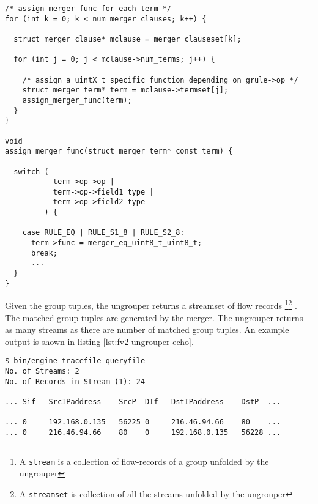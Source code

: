 \begin{lstlisting}
/* assign merger func for each term */
for (int k = 0; k < num_merger_clauses; k++) {

  struct merger_clause* mclause = merger_clauseset[k];

  for (int j = 0; j < mclause->num_terms; j++) {

    /* assign a uintX_t specific function depending on grule->op */
    struct merger_term* term = mclause->termset[j];
    assign_merger_func(term);
  }
}

void
assign_merger_func(struct merger_term* const term) {

  switch (
           term->op->op |
           term->op->field1_type |
           term->op->field2_type
         ) {

    case RULE_EQ | RULE_S1_8 | RULE_S2_8:
      term->func = merger_eq_uint8_t_uint8_t;
      break;
      ...
  }
}
\end{lstlisting}

Given the group tuples, the ungrouper returns a streamset of flow records
\footnote{A \texttt{stream} is a collection of flow-records of a group
unfolded by the ungrouper}\footnote{A \texttt{streamset} is collection of all
the streams unfolded by the ungrouper} . 
The matched group tuples are generated by the merger. The ungrouper returns as
many streams as there are number of matched group tuples.  An example output
is shown in listing \ref{lst:fv2-ungrouper-echo}.

\begin{lstlisting}
$ bin/engine tracefile queryfile
No. of Streams: 2
No. of Records in Stream (1): 24

... Sif   SrcIPaddress    SrcP  DIf   DstIPaddress    DstP  ...

... 0     192.168.0.135   56225 0     216.46.94.66    80    ...
... 0     216.46.94.66    80    0     192.168.0.135   56228 ...
\end{lstlisting}



